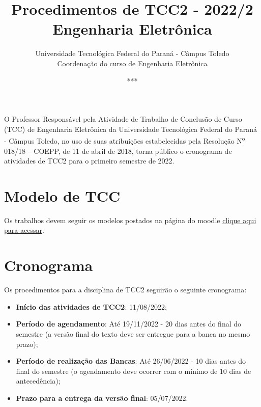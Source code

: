 \documentclass[a4paper, 12pt]{article}
\title{Procedimentos de TCC2 - 2022/2\\\textbf{Engenharia Eletrônica}}
\date{***}
\author{Universidade Tecnológica Federal do Paraná - Câmpus Toledo\\Coordenação do curso de Engenharia Eletrônica}
\newcommand{\utf}{Universidade Tecnológica Federal do Paraná - Câmpus Toledo}
\newcommand{\tcc}{Trabalho de Conclusão de Curso}
\begin{document}
    \maketitle
    
    O Professor Responsável pela Atividade de \tcc{ } (TCC) de Engenharia Eletrônica da \utf, no uso de suas atribuições estabelecidas pela Resolução N\textsuperscript{o} 018/18 – COEPP, de 11 de abril de 2018, torna público o cronograma de atividades de TCC2 para o primeiro semestre de 2022.


    

    \section{Modelo de TCC}
    Os trabalhos devem seguir os modelos postados na página do moodle \href{https://moodle.utfpr.edu.br/course/view.php?id=15669}{clique aqui para acessar}.
    
    \section{Cronograma}
    \label{sec:CRO}
    
    Os procedimentos para a disciplina de TCC2 seguirão o seguinte cronograma:
    \begin{itemize}
    	\item \textbf{Início das atividades de TCC2}: 11/08/2022;
    	\item \textbf{Período de agendamento}: Até 19/11/2022 - 20 dias antes do final do semestre (a versão final do texto deve ser entregue para a banca no mesmo prazo);
    	\item \textbf{Período de realização das Bancas}: Até 26/06/2022 - 10 dias antes do final do semestre (o agendamento deve ocorrer com o mínimo de 10 dias de antecedência);
    	\item \textbf{Prazo para a entrega da versão final}: 05/07/2022.
    \end{itemize}
\end{document}
